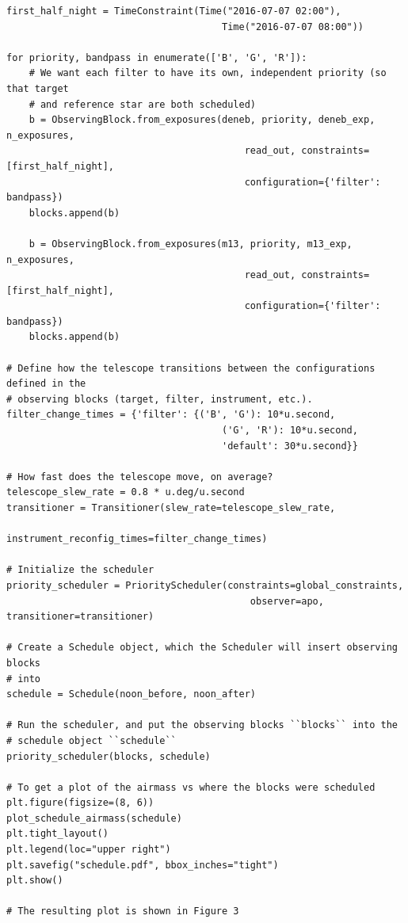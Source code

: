 \begin{subappendices}
\begin{lstlisting}
first_half_night = TimeConstraint(Time("2016-07-07 02:00"),
                                      Time("2016-07-07 08:00"))

for priority, bandpass in enumerate(['B', 'G', 'R']):
    # We want each filter to have its own, independent priority (so that target
    # and reference star are both scheduled)
    b = ObservingBlock.from_exposures(deneb, priority, deneb_exp, n_exposures,
                                          read_out, constraints=[first_half_night],
                                          configuration={'filter': bandpass})
    blocks.append(b)

    b = ObservingBlock.from_exposures(m13, priority, m13_exp, n_exposures,
                                          read_out, constraints=[first_half_night],
                                          configuration={'filter': bandpass})
    blocks.append(b)

# Define how the telescope transitions between the configurations defined in the
# observing blocks (target, filter, instrument, etc.).
filter_change_times = {'filter': {('B', 'G'): 10*u.second,
                                      ('G', 'R'): 10*u.second,
                                      'default': 30*u.second}}

# How fast does the telescope move, on average?
telescope_slew_rate = 0.8 * u.deg/u.second
transitioner = Transitioner(slew_rate=telescope_slew_rate,
                               instrument_reconfig_times=filter_change_times)

# Initialize the scheduler
priority_scheduler = PriorityScheduler(constraints=global_constraints,
                                           observer=apo, transitioner=transitioner)

# Create a Schedule object, which the Scheduler will insert observing blocks
# into
schedule = Schedule(noon_before, noon_after)

# Run the scheduler, and put the observing blocks ``blocks`` into the
# schedule object ``schedule``
priority_scheduler(blocks, schedule)

# To get a plot of the airmass vs where the blocks were scheduled
plt.figure(figsize=(8, 6))
plot_schedule_airmass(schedule)
plt.tight_layout()
plt.legend(loc="upper right")
plt.savefig("schedule.pdf", bbox_inches="tight")
plt.show()

# The resulting plot is shown in Figure 3
\end{lstlisting}


\end{subappendices}
